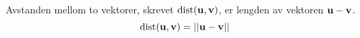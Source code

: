 Avstanden mellom to vektorer, skrevet $\text{dist}(\mathbf{u},\mathbf{v})$,
er lengden av vektoren $\mathbf{u}-\mathbf{v}$.
$$\text{dist}(\mathbf{u},\mathbf{v}) = ||\mathbf{u}-\mathbf{v}||$$
